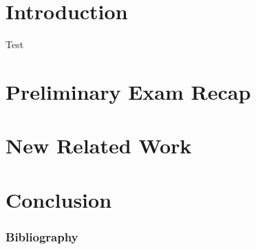 \documentclass[aspectratio=169,xcolor=dvipsnames]{beamer}
\begin{document}
  \frame\titlepage

  \section{Introduction}
  \begin{frame}
    Test
  \end{frame}

  \section{Preliminary Exam Recap}
  
  \section{New Related Work}

  \section{}

  \section{}

  \section{Conclusion}

  \begin{frame}%
    \frametitle{Bibliography}
    \printbibliography[heading=none] %
  \end{frame}

  \appendix
\end{document}
